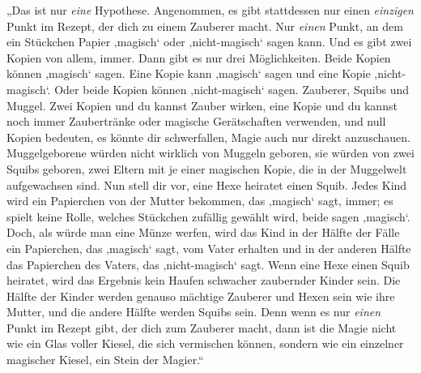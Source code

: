 „Das ist nur \emph{eine} Hypothese. Angenommen, es gibt stattdessen nur einen \emph{einzigen} Punkt im Rezept, der dich zu einem Zauberer macht. Nur \emph{einen} Punkt, an dem ein Stückchen Papier ‚magisch‘ oder ‚nicht-magisch‘ sagen kann. Und es gibt zwei Kopien von allem, immer. Dann gibt es nur drei Möglichkeiten. Beide Kopien können ‚magisch‘ sagen. Eine Kopie kann ‚magisch‘ sagen und eine Kopie ‚nicht-magisch‘. Oder beide Kopien können ‚nicht-magisch‘ sagen. Zauberer, Squibs und Muggel. Zwei Kopien und du kannst Zauber wirken, eine Kopie und du kannst noch immer Zaubertränke oder magische Gerätschaften verwenden, und null Kopien bedeuten, es könnte dir schwerfallen, Magie auch nur direkt anzuschauen. Muggelgeborene würden nicht wirklich von Muggeln geboren, sie würden von zwei Squibs geboren, zwei Eltern mit je einer magischen Kopie, die in der Muggelwelt aufgewachsen sind. Nun stell dir vor, eine Hexe heiratet einen Squib. Jedes Kind wird ein Papierchen von der Mutter bekommen, das ‚magisch‘ sagt, immer; es spielt keine Rolle, welches Stückchen zufällig gewählt wird, beide sagen ‚magisch‘. Doch, als würde man eine Münze werfen, wird das Kind in der Hälfte der Fälle ein Papierchen, das ‚magisch‘ sagt, vom Vater erhalten und in der anderen Hälfte das Papierchen des Vaters, das ‚nicht-magisch‘ sagt. Wenn eine Hexe einen Squib heiratet, wird das Ergebnis kein Haufen schwacher zaubernder Kinder sein. Die Hälfte der Kinder werden genauso mächtige Zauberer und Hexen sein wie ihre Mutter, und die andere Hälfte werden Squibs sein. Denn wenn es nur \emph{einen} Punkt im Rezept gibt, der dich zum Zauberer macht, dann ist die Magie nicht wie ein Glas voller Kiesel, die sich vermischen können, sondern wie ein einzelner magischer Kiesel, ein Stein der Magier.“%

